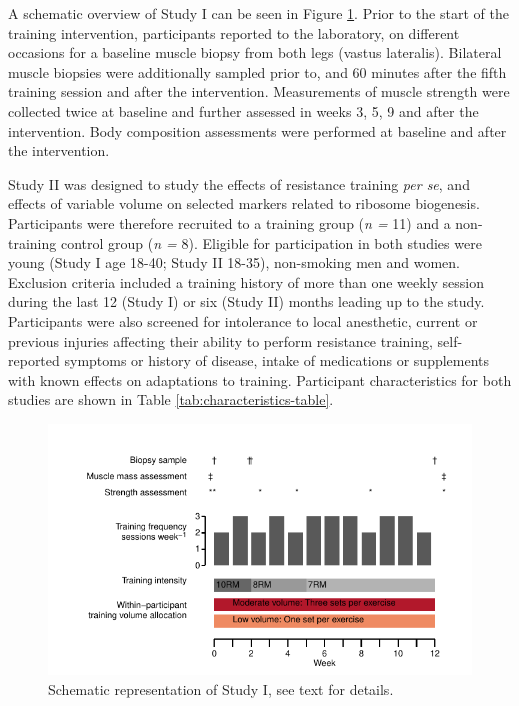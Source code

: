 \documentclass[twoside,10pt]{gihclass} %
\begin{document}
A schematic overview of Study I can be seen in Figure \ref{fig:study1-overview}. Prior to the start of the training intervention, participants reported to the laboratory, on different occasions for a baseline muscle biopsy from both legs (vastus lateralis).
Bilateral muscle biopsies were additionally sampled prior to, and 60 minutes after the fifth training session and after the intervention.
Measurements of muscle strength were collected twice at baseline and further assessed in weeks 3, 5, 9 and after the intervention.
Body composition assessments were performed at baseline and after the intervention.

Study II was designed to study the effects of resistance training \emph{per
se}, and effects of variable volume on selected markers related to
ribosome biogenesis. Participants were therefore recruited to a training
group (\emph{n =} 11) and a non-training control group (\emph{n =} 8).
Eligible for participation in both studies were young (Study I age 18-40; Study
II 18-35), non-smoking men and women. Exclusion criteria included a
training history of more than one weekly session during the last 12
(Study I) or six (Study II) months leading up to the study. Participants
were also screened for intolerance to local anesthetic, current or
previous injuries affecting their ability to perform resistance
training, self-reported symptoms or history of disease, intake of
medications or supplements with known effects on adaptations to training.
Participant characteristics for both studies are shown in Table
\ref{tab:characteristics-table}.
\begin{figure}

{\centering \includegraphics{thesis_files/figure-latex/study1-overview-1} 

}

\caption[Study I, schematic overview]{Schematic representation of Study I, see text for details.  }\label{fig:study1-overview}
\end{figure}
\end{document}
